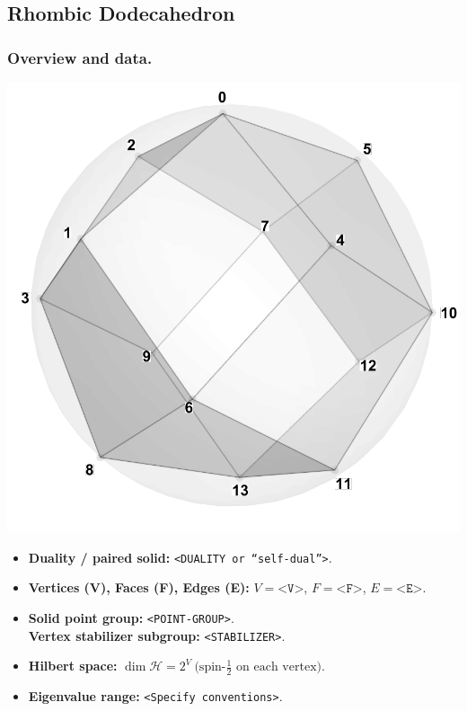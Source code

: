 \documentclass[11pt,a4paper]{article}
\begin{document}

\subsection*{Rhombic Dodecahedron}

\subsubsection*{Overview and data.}
\begin{center}
  \includegraphics[width=.6\linewidth]{rhombicdodecahedron}
\end{center}

\begin{itemize}[leftmargin=1.5em]
  \item \textbf{Duality / paired solid:} \texttt{<DUALITY or “self-dual”>}.
  \item \textbf{Vertices (V), Faces (F), Edges (E):} $V=\texttt{<V>}$,\; $F=\texttt{<F>}$,\; $E=\texttt{<E>}$.
  \item \textbf{Solid point group:} \texttt{<POINT-GROUP>}.\\
        \textbf{Vertex stabilizer subgroup:} \texttt{<STABILIZER>}.
  \item \textbf{Hilbert space:} \(
        \dim\mathcal{H} = 2^{V}\ \text{(spin-$\tfrac12$ on each vertex).}
        \)
  \item \textbf{Eigenvalue range:} \texttt{<Specify conventions>}.
\end{itemize}
\end{document}
